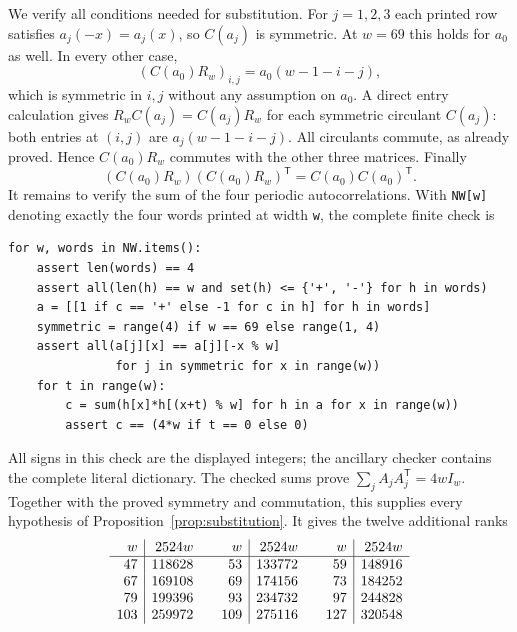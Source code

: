 \documentclass[10pt]{article}
\begin{document}
We verify all conditions needed for substitution. For $j=1,2,3$ each
printed row satisfies $a_j(-x)=a_j(x)$, so $C(a_j)$ is symmetric. At
$w=69$ this holds for $a_0$ as well. In every other case,
\[
 (C(a_0)R_w)_{i,j}=a_0(w-1-i-j),
\]
which is symmetric in $i,j$ without any assumption on $a_0$. A direct
entry calculation gives $R_wC(a_j)=C(a_j)R_w$ for each symmetric
circulant $C(a_j)$: both entries at $(i,j)$ are
$a_j(w-1-i-j)$. All circulants commute, as already proved. Hence
$C(a_0)R_w$ commutes with the other three matrices. Finally
\[
 (C(a_0)R_w)(C(a_0)R_w)^{\mathsf T}=C(a_0)C(a_0)^{\mathsf T}.
\]
It remains to verify the sum of the four periodic autocorrelations. With
\texttt{NW[w]} denoting exactly the four words printed at width
\texttt{w}, the complete finite check is
\begin{verbatim}
for w, words in NW.items():
    assert len(words) == 4
    assert all(len(h) == w and set(h) <= {'+', '-'} for h in words)
    a = [[1 if c == '+' else -1 for c in h] for h in words]
    symmetric = range(4) if w == 69 else range(1, 4)
    assert all(a[j][x] == a[j][-x % w]
               for j in symmetric for x in range(w))
    for t in range(w):
        c = sum(h[x]*h[(x+t) % w] for h in a for x in range(w))
        assert c == (4*w if t == 0 else 0)
\end{verbatim}
All signs in this check are the displayed integers; the ancillary checker
contains the complete literal dictionary. The checked sums prove
$\sum_jA_jA_j^{\mathsf T}=4wI_w$. Together with the proved symmetry and
commutation, this supplies every hypothesis of
Proposition~\ref{prop:substitution}. It gives the twelve additional ranks
\[
\begin{array}{r|r@{\qquad}r|r@{\qquad}r|r}
w&2524w&w&2524w&w&2524w\\\hline
47&118628&53&133772&59&148916\\
67&169108&69&174156&73&184252\\
79&199396&93&234732&97&244828\\
103&259972&109&275116&127&320548\\
\end{array}
\]
\end{document}
